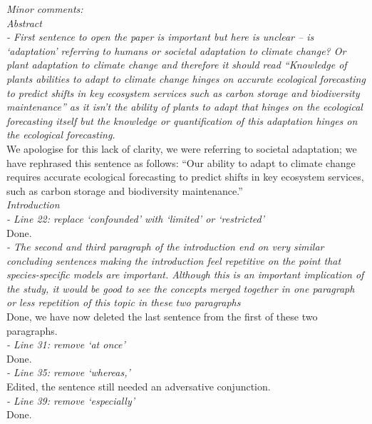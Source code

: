\documentclass[11pt]{article}
\begin{document}
\emph{Minor comments:}\\

\emph{Abstract}\\
\emph{- First sentence to open the paper is important but here is unclear – is ‘adaptation’ referring to humans or societal adaptation to climate change? Or plant adaptation to climate change and therefore it should read “Knowledge of plants abilities to adapt to climate change hinges on accurate ecological forecasting to predict shifts in key ecosystem services such as carbon storage and biodiversity maintenance” as it isn’t the ability of plants to adapt that hinges on the ecological forecasting itself but the knowledge or quantification of this adaptation hinges on the ecological forecasting.}\\

We apologise for this lack of clarity, we were referring to societal adaptation; we have rephrased this sentence as follows: ``Our ability to adapt to climate change requires accurate ecological forecasting to predict shifts in key ecosystem services, such as carbon storage and biodiversity maintenance.'' \\ %

\emph{Introduction}\\
\emph{- Line 22: replace ‘confounded’ with ‘limited’ or ‘restricted’}\\
Done.\\

\emph{- The second and third paragraph of the introduction end on very similar concluding sentences making the introduction feel repetitive on the point that species-specific models are important. Although this is an important implication of the study, it would be good to see the concepts merged together in one paragraph or less repetition of this topic in these two paragraphs}\\
Done, we have now deleted the last sentence from the first of these two paragraphs.\\

\emph{- Line 31: remove ‘at once’}\\
Done.\\

\emph{- Line 35: remove ‘whereas,’}\\
Edited, the sentence still needed an adversative conjunction.\\

\emph{- Line 39: remove ‘especially’}\\
Done.\\
\end{document}
